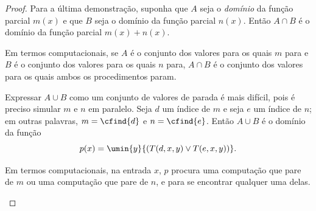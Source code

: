 \documentclass[../../../include/open-logic-section]{subfiles}
\begin{document}
\begin{proof}
Para a última demonstração, suponha que $A$ seja o \emph{domínio} da
função parcial $m(x)$ e que $B$ seja o domínio da função parcial
$n(x)$. Então $A \cap B$ é o domínio da função parcial $m(x) + n(x)$.

\begin{explain}
Em termos computacionais, se $A$ é o conjunto dos valores para os quais
$m$ para e $B$ é o conjunto dos valores para os quais $n$ para,
$A \cap B$ é o conjunto dos valores para os quais ambos os procedimentos
param.
\end{explain}

Expressar $A \cup B$ como um conjunto de valores de parada é mais
difícil, pois é preciso simular $m$ e $n$ em paralelo. Seja $d$ um
índice de $m$ e seja $e$ um índice de $n$; em outras palavras,
$m = \cfind{d}$ e $n = \cfind{e}$. Então $A \cup B$ é o domínio da
função
\[
p(x) = \umin{y}{(T(d,x,y) \lor T(e,x,y))}.
\]
\begin{explain}
Em termos computacionais, na entrada $x$, $p$ procura uma computação
que pare de $m$ ou uma computação que pare de $n$, e para se encontrar
qualquer uma delas.
\end{explain}
\end{proof}
\end{document}
